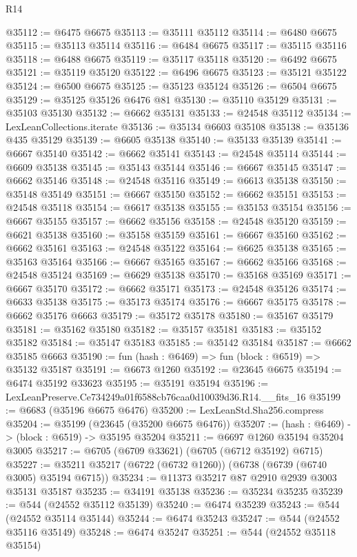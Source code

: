 \begin{lexlean}{R14}
\begin{coremodule}
@35112 := @6475 @6675
@35113 := @35111 @35112
@35114 := @6480 @6675
@35115 := @35113 @35114
@35116 := @6484 @6675
@35117 := @35115 @35116
@35118 := @6488 @6675
@35119 := @35117 @35118
@35120 := @6492 @6675
@35121 := @35119 @35120
@35122 := @6496 @6675
@35123 := @35121 @35122
@35124 := @6500 @6675
@35125 := @35123 @35124
@35126 := @6504 @6675
@35129 := @35125 @35126 @6476 @81
@35130 := @35110 @35129
@35131 := @35103 @35130
@35132 := @6662 @35131
@35133 := @24548 @35112
@35134 := LexLeanCollections.iterate
@35136 := @35134 @6603 @35108
@35138 := @35136 @435 @35129
@35139 := @6605 @35138
@35140 := @35133 @35139
@35141 := @6667 @35140
@35142 := @6662 @35141
@35143 := @24548 @35114
@35144 := @6609 @35138
@35145 := @35143 @35144
@35146 := @6667 @35145
@35147 := @6662 @35146
@35148 := @24548 @35116
@35149 := @6613 @35138
@35150 := @35148 @35149
@35151 := @6667 @35150
@35152 := @6662 @35151
@35153 := @24548 @35118
@35154 := @6617 @35138
@35155 := @35153 @35154
@35156 := @6667 @35155
@35157 := @6662 @35156
@35158 := @24548 @35120
@35159 := @6621 @35138
@35160 := @35158 @35159
@35161 := @6667 @35160
@35162 := @6662 @35161
@35163 := @24548 @35122
@35164 := @6625 @35138
@35165 := @35163 @35164
@35166 := @6667 @35165
@35167 := @6662 @35166
@35168 := @24548 @35124
@35169 := @6629 @35138
@35170 := @35168 @35169
@35171 := @6667 @35170
@35172 := @6662 @35171
@35173 := @24548 @35126
@35174 := @6633 @35138
@35175 := @35173 @35174
@35176 := @6667 @35175
@35178 := @6662 @35176 @6663
@35179 := @35172 @35178
@35180 := @35167 @35179
@35181 := @35162 @35180
@35182 := @35157 @35181
@35183 := @35152 @35182
@35184 := @35147 @35183
@35185 := @35142 @35184
@35187 := @6662 @35185 @6663
@35190 := fun (hash : @6469) => fun (block : @6519) => @35132 @35187
@35191 := @6673 @1260
@35192 := @23645 @6675
@35194 := @6474 @35192 @33623
@35195 := @35191 @35194
@35196 := LexLeanPreserve.Ce734249a01f6588cb76caa0d10039d36.R14.__fits_16
@35199 := @6683 (@35196 @6675 @6476)
@35200 := LexLeanStd.Sha256.compress
@35204 := @35199 (@23645 (@35200 @6675 @6476))
@35207 := (hash : @6469) -> (block : @6519) -> @35195 @35204
@35211 := @6697 @1260 @35194 @35204 @3005
@35217 := @6705 (@6709 @33621) (@6705 (@6712 @35192) @6715)
@35227 := @35211 @35217 (@6722 (@6732 @1260)) (@6738 (@6739 (@6740 @3005) @35194 @6715))
@35234 := @11373 @35217 @87 @2910 @2939 @3003 @35131 @35187
@35235 := @34191 @35138
@35236 := @35234 @35235
@35239 := @544 (@24552 @35112 @35139)
@35240 := @6474 @35239
@35243 := @544 (@24552 @35114 @35144)
@35244 := @6474 @35243
@35247 := @544 (@24552 @35116 @35149)
@35248 := @6474 @35247
@35251 := @544 (@24552 @35118 @35154)

\end{coremodule}
\end{lexlean}
